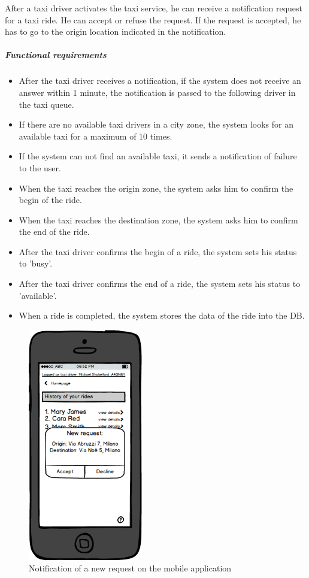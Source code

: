 After a taxi driver activates the taxi service, he can receive a notification request for a taxi ride. He can accept or refuse the request. If the request is accepted, he has to go to the origin location indicated in the notification.


\subparagraph{Functional requirements}
\noindent
    \begin{itemize}
        \item After the taxi driver receives a notification, if the system does not receive an answer within 1 minute, the notification is passed to the following driver in the taxi queue.
        \item If there are no available taxi drivers in a city zone, the system looks for an available taxi for a maximum of 10 times. 
        \item If the system can not find an available taxi, it sends a notification of failure to the user.
        \item When the taxi reaches the origin zone, the system asks him to confirm the begin of the ride.
        \item When the taxi reaches the destination zone, the system asks him to confirm the end of the ride.
        \item After the taxi driver confirms the begin of a ride, the system sets his status to 'busy'.
        \item After the taxi driver confirms the end of a ride, the system sets his status to 'available'.
        \item When a ride is completed, the system stores the data of the ride into the DB.
    \end{itemize}
    
\begin{figure}[H]
    \centering
    \includegraphics[width=5cm]{./Mockups/RequestHandling.png}
    \caption{Notification of a new request on the mobile application}
\end{figure}
